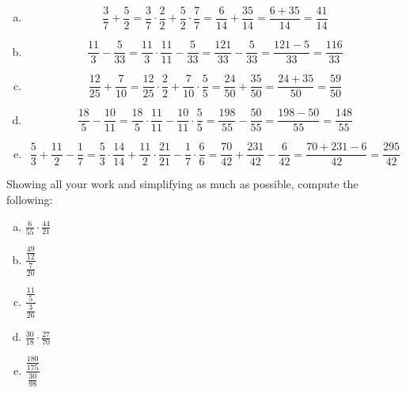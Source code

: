 \documentclass[11pt,letterpaper]{article}
\begin{document}
\sol 
\begin{enumerate}[(a)]
\item 
	\[
	\dfrac{3}{7} + \dfrac{5}{2}= \dfrac{3}{7} \cdot \dfrac{2}{2}+ \dfrac{5}{2} \cdot \dfrac{7}{7}= \dfrac{6}{14} + \dfrac{35}{14}= \dfrac{6 + 35}{14}= \dfrac{41}{14}
	\] \pspace

\item 
	\[
	\dfrac{11}{3}  - \dfrac{5}{33}= \dfrac{11}{3}  \cdot \dfrac{11}{11} - \dfrac{5}{33}= \dfrac{121}{33} - \dfrac{5}{33}= \dfrac{121 - 5}{33}= \dfrac{116}{33}
	\] \pspace
 
\item 
	\[
	\dfrac{12}{25} + \dfrac{7}{10}= \dfrac{12}{25} \cdot \dfrac{2}{2} + \dfrac{7}{10} \cdot \dfrac{5}{5}= \dfrac{24}{50} + \dfrac{35}{50}= \dfrac{24 + 35}{50}= \dfrac{59}{50}
	\] \pspace

\item 
	\[
	\dfrac{18}{5} - \dfrac{10}{11}= \dfrac{18}{5} \cdot \dfrac{11}{11} - \dfrac{10}{11} \cdot \dfrac{5}{5}= \dfrac{198}{55} - \dfrac{50}{55}= \dfrac{198 - 50}{55}= \dfrac{148}{55}
	\] \pspace

\item 
	\[
	\dfrac{5}{3} + \dfrac{11}{2} - \dfrac{1}{7}= \dfrac{5}{3} \cdot \dfrac{14}{14} + \dfrac{11}{2} \cdot \dfrac{21}{21} - \dfrac{1}{7} \cdot \dfrac{6}{6}= \dfrac{70}{42} + \dfrac{231}{42} - \dfrac{6}{42}= \dfrac{70 + 231 - 6}{42}= \dfrac{295}{42}
	\] 
\end{enumerate}



\newpage



 Showing all your work and simplifying as much as possible, compute the following:
	\begin{enumerate}[(a)]
	\item $\frac{6}{55} \cdot \frac{44}{21}$
	\item $\dfrac{\frac{49}{12}}{\frac{7}{20}}$
	\item $\dfrac{\frac{11}{5}}{\frac{3}{26}}$
	\item $\frac{30}{18} \cdot \frac{27}{70}$
	\item $\dfrac{\frac{180}{175}}{\frac{30}{98}}$
	\end{enumerate} \pspace
\end{document}
